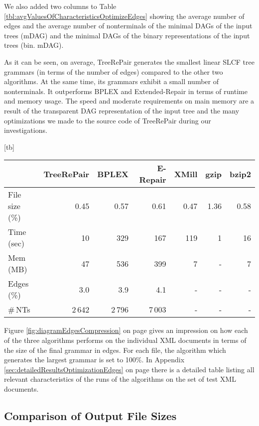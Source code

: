 \documentclass[12pt]{llncs}
\makeatletter
\renewenvironment{table}
               {\setlength\abovecaptionskip{10\p@}\setlength\belowcaptionskip{10\p@}\@float{table}}
               {\end@float}
\newcommand{\trp}{\mbox{TreeRePair}\xspace}
\makeatother
\begin{document}
We also added two columns to Table \ref{tbl:avgValuesOfCharacteristicsOptimizeEdges} showing the average number of edges and the average number of nonterminals of the minimal DAGs of the input trees (mDAG) and the minimal DAGs of the binary representations of the input trees (bin. mDAG).

As it can be seen, on average, \trp generates the smallest linear SLCF tree grammars (in terms of the number of edges) compared to the other two algorithms. At the same time, its grammars exhibit a small number of nonterminals. It outperforms BPLEX and Extended-Repair in terms of runtime and memory usage. The speed and moderate requirements on main memory are a result of the transparent DAG representation of the input tree and the many optimizations we made to the source code of \trp during our investigations.

\begin{table}[tb]
	\centering\small
	\begin{tabular}{lrrrrrr}
		\toprule
		&\trp&BPLEX&E-Repair&XMill&gzip&bzip2\\
		\midrule
		File size (\%)&0.45&0.57&0.61&0.47&1.36&0.58\\
		\midrule
		Time (sec)&10&329&167&119&\,1&16\\
		Mem (MB)&47&536&399&7&-&7\\
		Edges (\%)&3.0&3.9&4.1&-&-&-\\
		\#\,NTs&2\,642&2\,796&7\,003&-&-&-\\
		\bottomrule
	\end{tabular}
	\caption{Average values of the characteristics of the runs of the three algorithms when making a small size of the output file top priority.}\label{tbl:avgValuesOfCharacteristicsOptimizeFileSize}
\end{table}

Figure \ref{fig:diagramEdgesCompression} on page \pageref{fig:diagramEdgesCompression} gives an impression on how each of the three algorithms performs on the individual XML documents in terms of the size of the final grammar in edges. For each file, the algorithm which generates the largest grammar is set to 100\%. In Appendix \ref{sec:detailedResultsOptimizationEdges} on page \pageref{sec:detailedResultsOptimizationEdges} there is a detailed table listing all relevant characteristics of the runs of the algorithms on the set of test XML documents.

\subsection{Comparison of Output File Sizes}
\end{document}

